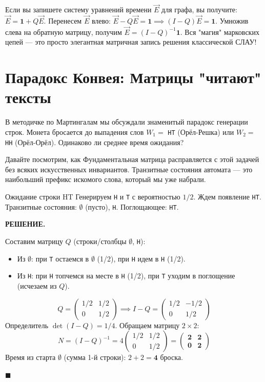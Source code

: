 \documentclass[12pt,a4paper]{article}
\newenvironment{solution}{
    \begin{tcolorbox}[
        enhanced, breakable, blanker,
        borderline west={2.5pt}{0pt}{solgray},
        left=12pt, top=5pt, bottom=5pt,
        before skip=10pt, after skip=15pt
    ]
    \textbf{\textsf{РЕШЕНИЕ.}}\;
}{
    \hfill $\blacksquare$
    \end{tcolorbox}
}
\begin{document}
\begin{insight}
Если вы запишете систему уравнений времени $\vec{E}$ для графа, вы получите: $\vec{E} = \mathbf{1} + Q \vec{E}$.
Перенесем $\vec{E}$ влево: $\vec{E} - Q \vec{E} = \mathbf{1} \implies (I - Q)\vec{E} = \mathbf{1}$.
Умножив слева на обратную матрицу, получим $\vec{E} = (I - Q)^{-1} \mathbf{1}$. 
Вся "магия" марковских цепей — это просто элегантная матричная запись решения классической СЛАУ!
\end{insight}

\newpage
\section{Парадокс Конвея: Матрицы "читают" тексты}

В методичке по Мартингалам мы обсуждали знаменитый парадокс генерации строк. Монета бросается до выпадения слов $W_1=$ \texttt{HT} (Орёл-Решка) или $W_2=$ \texttt{HH} (Орёл-Орёл). Одинаково ли среднее время ожидания? 

Давайте посмотрим, как Фундаментальная матрица расправляется с этой задачей без всяких искусственных инвариантов. Транзитные состояния автомата — это наибольший префикс искомого слова, который мы уже набрали.

\begin{problem}{Ожидание строки HT}{}
Генерируем \texttt{H} и \texttt{T} с вероятностью $1/2$. Ждем появление \texttt{HT}.
Транзитные состояния: $\emptyset$ (пусто), \texttt{H}. Поглощающее: \texttt{HT}.
\end{problem}
\begin{solution}
Составим матрицу $Q$ (строки/столбцы $\emptyset$, \texttt{H}):
\begin{itemize}
    \item Из $\emptyset$: при \texttt{T} остаемся в $\emptyset$ (1/2), при \texttt{H} идем в \texttt{H} (1/2).
    \item Из \texttt{H}: при \texttt{H} топчемся на месте в \texttt{H} (1/2), при \texttt{T} уходим в поглощение (исчезаем из $Q$).
\end{itemize}
\[ Q = \begin{pmatrix} 1/2 & 1/2 \\ 0 & 1/2 \end{pmatrix} \implies I - Q = \begin{pmatrix} 1/2 & -1/2 \\ 0 & 1/2 \end{pmatrix} \]
Определитель $\det(I-Q) = 1/4$. Обращаем матрицу $2 \times 2$:
\[ N = (I-Q)^{-1} = 4 \begin{pmatrix} 1/2 & 1/2 \\ 0 & 1/2 \end{pmatrix} = \mathbf{\begin{pmatrix} 2 & 2 \\ 0 & 2 \end{pmatrix}} \]
Время из старта $\emptyset$ (сумма 1-й строки): $2 + 2 = \mathbf{4}$ броска.
\end{solution}
\end{document}
